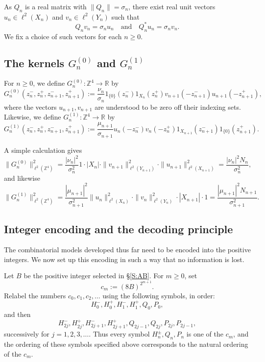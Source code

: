 \documentclass[11pt,reqno]{amsart}
\theoremstyle{plain}
\theoremstyle{definition}
\theoremstyle{remark}
\newcommand{\RR}{\mathbb{R}}
\newcommand{\ZZ}{\mathbb{Z}}
\begin{document}
As $Q_n$ is a real matrix with $\|Q_n\|=\sigma_n$, 
there exist real unit vectors $u_n\in\ell^2(X_n)$
and $v_n\in\ell^2(Y_n)$ such that
\[
Q_nv_n=\sigma_nu_n
\quad\text{and}\quad
Q_n^*u_n=\sigma_n v_n.
\]
We fix a choice of such vectors for each $n\ge0$.


\subsection{The kernels $G_n^{(0)}$ and $G_n^{(1)}$}

For $n\ge0$, we define $G_n^{(0)}:\ZZ^4\to\RR$ by
\[
G_n^{(0)}(z_n^-,z_n^+,z_{n+1}^-,z_{n+1}^+):=
\frac{\nu_n}{\sigma_n}1_{\{0\}}(z_n^-)1_{X_n}(z_n^+)v_{n+1}(-z_{n+1}^-)u_{n+1}(-z_{n+1}^+),
\]
where the vectors $u_{n+1},v_{n+1}$ are understood to be zero off their indexing sets.
Likewise, we define $G_n^{(1)}:\ZZ^4\to\RR$ by
\[
G_n^{(1)}(z_n^-,z_n^+,z_{n+1}^-,z_{n+1}^+):=
\frac{\mu_{n+1}}{\sigma_{n+1}}u_n(-z_n^-)v_n(-z_n^+)1_{X_{n+1}}(z_{n+1}^-)1_{\{0\}}(z_{n+1}^+).
\]

A simple calculation gives
\begin{equation}\label{E:G0norm}
\|G_n^{(0)}\|_{\ell^2(\ZZ^4)}^2
=\frac{|\nu_n|^2}{\sigma_n^2}1\cdot|X_n|\cdot\|v_{n+1}\|_{\ell^2(Y_{n+1})}^2\cdot\|u_{n+1}\|_{\ell^2(X_{n+1})}^2
=\frac{|\nu_n|^2N_n}{\sigma_n^2},
\end{equation}
and likewise
\begin{equation}\label{E:G1norm}
\|G_n^{(1)}\|_{\ell^2(\ZZ^4)}^2
=\frac{|\mu_{n+1}|^2}{\sigma_{n+1}^2}\|u_n\|_{\ell^2(X_n)}^2\cdot\|v_n\|_{\ell^2(Y_n)}^2\cdot|X_{n+1}|\cdot1
=\frac{|\mu_{n+1}|^2N_{n+1}}{\sigma_{n+1}^2}.
\end{equation}


\subsection{Integer encoding and the decoding principle}\label{S:encoding}
The combinatorial models developed thus far
need to be encoded into the positive integers.
We now set up this encoding in such a way that no information is lost.

Let $B$ be the positive integer selected in \S\ref{S:AB}.
For $m\ge0$, set 
\[
c_m:=(8B)^{2^{m+1}}.
\]
Relabel the numbers $c_0,c_1,c_2,\dots$ using the following symbols, in order:
\[
H_0^-,H_0^+,H_1^-,H_1^+,Q_0,P_0,
\]
and then 
\[
H_{2j}^-,H_{2j}^+,H_{2j+1}^-,H_{2j+1}^+,Q_{2j-1},Q_{2j},P_{2j},P_{2j-1},
\]
successively for $j=1,2,3,\dots$.
Thus every symbol $H_n^{\pm},Q_n,P_n$ is one of the $c_m$,
and the ordering of these symbols specified above corresponds to the natural ordering of the $c_m$.
\end{document}
